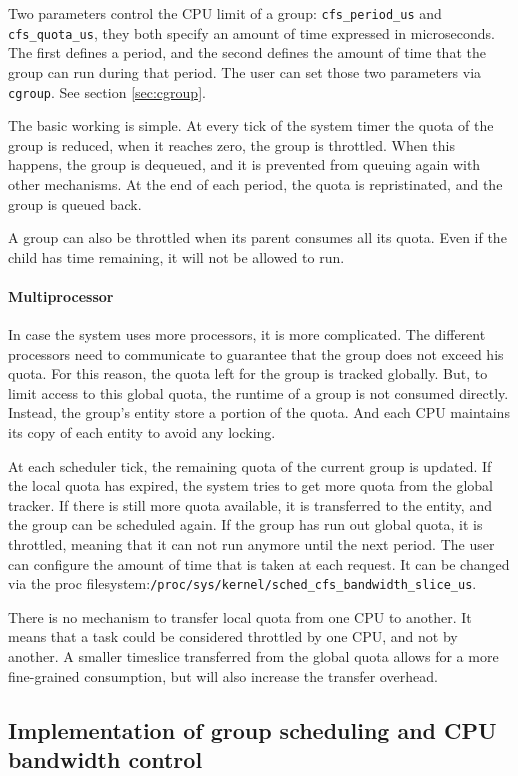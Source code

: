 Two parameters control the CPU limit of a group:  \verb|cfs_period_us| and \verb|cfs_quota_us|, they both specify an amount of time expressed in microseconds. The first defines a period, and the second defines the amount of time that the group can run during that period. The user can set those two parameters via \verb|cgroup|. See section \ref{sec:cgroup}.

The basic working is simple. At every tick of the system timer the quota of the group is reduced, when it reaches zero, the group is throttled. When this happens, the group is dequeued, and it is prevented from queuing again with other mechanisms. At the end of each period, the quota is repristinated, and the group is queued back.

A group can also be throttled when its parent consumes all its quota. Even if the child has time remaining, it will not be allowed to run.

\paragraph{Multiprocessor}
In case the system uses more processors, it is more complicated. The different processors need to communicate to guarantee that the group does not exceed his quota. For this reason, the quota left for the group is tracked globally. But, to limit access to this global quota, the runtime of a group is not consumed directly. Instead, the group's entity store a portion of the quota. And each CPU maintains its copy of each entity to avoid any locking.

At each scheduler tick, the remaining quota of the current group is updated. If the local quota has expired, the system tries to get more quota from the global tracker. If there is still more quota available, it is transferred to the entity, and the group can be scheduled again. If the group has run out global quota, it is throttled, meaning that it can not run anymore until the next period. The user can configure the amount of time that is taken at each request. It can be changed via the proc filesystem:\verb|/proc/sys/kernel/sched_cfs_bandwidth_slice_us|.

There is no mechanism to transfer local quota from one CPU to another. It means that a task could be considered throttled by one CPU, and not by another. A smaller timeslice transferred from the global quota allows for a more fine-grained consumption, but will also increase the transfer overhead.

\subsection{Implementation of group scheduling and CPU bandwidth control}
\label{sec:group_sched_impl}

